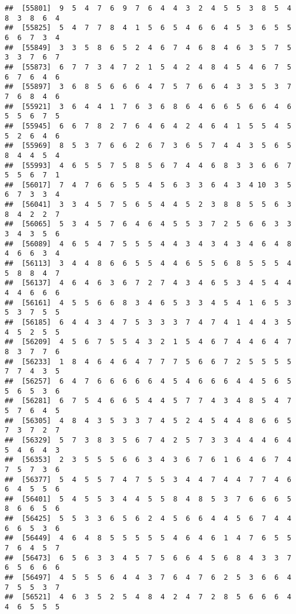 \documentclass[
]{book}
\begin{document}
\begin{verbatim}
##  [55801]  9  5  4  7  6  9  7  6  4  4  3  2  4  5  5  3  8  5  4  8  3  8  6  4
##  [55825]  5  4  7  7  8  4  1  5  6  5  4  6  6  4  5  3  6  5  5  6  6  7  3  4
##  [55849]  3  3  5  8  6  5  2  4  6  7  4  6  8  4  6  3  5  7  5  3  3  7  6  7
##  [55873]  6  7  7  3  4  7  2  1  5  4  2  4  8  4  5  4  6  7  5  6  7  6  4  6
##  [55897]  3  6  8  5  6  6  6  4  7  5  7  6  6  4  3  3  5  3  7  7  6  8  4  6
##  [55921]  3  6  4  4  1  7  6  3  6  8  6  4  6  6  5  6  6  4  6  5  5  6  7  5
##  [55945]  6  6  7  8  2  7  6  4  6  4  2  4  6  4  1  5  5  4  5  5  2  6  4  6
##  [55969]  8  5  3  7  6  6  2  6  7  3  6  5  7  4  4  3  5  6  5  8  4  4  5  4
##  [55993]  4  6  5  5  7  5  8  5  6  7  4  4  6  8  3  3  6  6  7  5  5  6  7  1
##  [56017]  7  4  7  6  6  5  5  4  5  6  3  3  6  4  3  4 10  3  5  6  7  3  3  4
##  [56041]  3  3  4  5  7  5  6  5  4  4  5  2  3  8  8  5  5  6  3  8  4  2  2  7
##  [56065]  5  3  4  5  7  6  4  6  4  5  5  3  7  2  5  6  6  3  3  3  4  3  5  6
##  [56089]  4  6  5  4  7  5  5  5  4  4  3  4  3  4  3  4  6  4  8  4  6  6  3  4
##  [56113]  3  4  4  8  6  6  5  5  4  4  6  5  5  6  8  5  5  5  4  5  8  8  4  7
##  [56137]  4  6  4  6  3  6  7  2  7  4  3  4  6  5  3  4  5  4  4  4  4  6  6  6
##  [56161]  4  5  5  6  6  8  3  4  6  5  3  3  4  5  4  1  6  5  3  5  3  7  5  5
##  [56185]  6  4  4  3  4  7  5  3  3  3  7  4  7  4  1  4  4  3  5  4  5  2  5  5
##  [56209]  4  5  6  7  5  5  4  3  2  1  5  4  6  7  4  4  6  4  7  8  3  7  7  6
##  [56233]  1  8  4  6  4  6  4  7  7  7  5  6  6  7  2  5  5  5  5  7  7  4  3  5
##  [56257]  6  4  7  6  6  6  6  6  4  5  4  6  6  6  4  4  5  6  5  5  6  5  3  6
##  [56281]  6  7  5  4  6  6  5  4  4  5  7  7  4  3  4  8  5  4  7  5  7  6  4  5
##  [56305]  4  8  4  3  5  3  3  7  4  5  2  4  5  4  4  8  6  6  5  7  3  7  2  7
##  [56329]  5  7  3  8  3  5  6  7  4  2  5  7  3  3  4  4  4  6  4  5  4  6  4  3
##  [56353]  2  3  5  5  5  6  6  3  4  3  6  7  6  1  6  4  6  7  4  7  5  7  3  6
##  [56377]  5  4  5  5  7  4  7  5  5  3  4  4  7  4  4  7  7  4  6  6  4  5  5  6
##  [56401]  5  4  5  5  3  4  4  5  5  8  4  8  5  3  7  6  6  6  5  8  6  6  5  6
##  [56425]  5  5  3  3  6  5  6  2  4  5  6  6  4  4  5  6  7  4  4  6  6  5  3  6
##  [56449]  4  6  4  8  5  5  5  5  5  4  6  4  6  1  4  7  6  5  5  7  6  4  5  7
##  [56473]  6  5  6  3  3  4  5  7  5  6  6  4  5  6  8  4  3  3  7  6  5  6  6  6
##  [56497]  4  5  5  5  6  4  4  3  7  6  4  7  6  2  5  3  6  6  4  7  5  5  3  7
##  [56521]  4  6  3  5  2  5  4  8  4  2  4  7  2  8  5  6  6  6  4  4  6  5  5  5

\end{verbatim}
\end{document}
